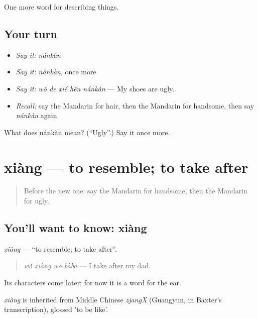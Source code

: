 \begin{grammarlens}[title={What you've built}]
One more word for describing things.
\end{grammarlens}

\subsection*{Your turn}
\begin{itemize}
\raggedright
  \item \emph{Say it:} \emph{nánkàn}
  \item \emph{Say it:} \emph{nánkàn}, once more
  \item \emph{Say it:} \emph{wǒ de xié hěn nánkàn} — My shoes are ugly.
  \item \emph{Recall:} say the Mandarin for hair, then the Mandarin for handsome, then say \emph{nánkàn} again
\end{itemize}

\begin{tcolorbox}[breakable,colback=teal!4,colframe=teal!35!black,title={Before you move on}]
What does nánkàn mean? (\textquotedblleft{}Ugly\textquotedblright{}.) Say it once more.
\end{tcolorbox}
\section[xiàng]{xiàng — to resemble; to take after}

\label{lesson:ZH-C124-xiang-resemble}



\begin{quote}
Before the new one: say the Mandarin for handsome, then the Mandarin for ugly.
\end{quote}

\subsection*{You'll want to know: xiàng}
\emph{xiàng} — \textquotedblleft{}to resemble; to take after\textquotedblright{}.

\begin{quote}
\emph{wǒ xiàng wǒ bàba} — I take after my dad.
\end{quote}

Its characters come later; for now it is a word for the ear.

\begin{cousinweb}
\emph{xiàng} is inherited from Middle Chinese \emph{zjangX} (Guangyun, in Baxter's transcription), glossed 'to be like'.
\end{cousinweb}

